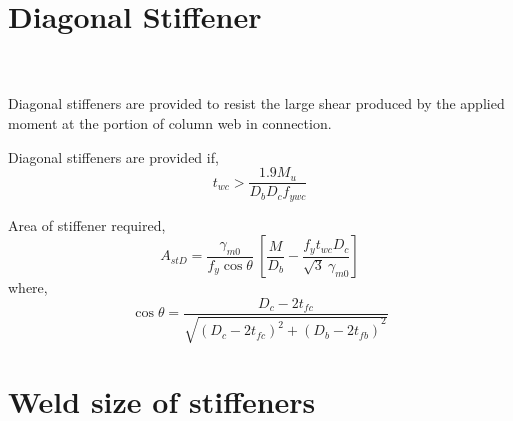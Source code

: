 \documentclass[11.5pt,a4paper,oneside]{report}
\begin{document}
\begin{Form}
\section{Diagonal Stiffener}
\qquad {} \\ \\

Diagonal stiffeners are provided to resist the large shear produced by the applied moment at the portion of column web in connection. 


Diagonal stiffeners are provided if,
\begin{equation}
	t_{wc} > \frac{1.9 M_u}{D_b D_c f_{ywc}}
\end{equation}

Area of stiffener required, 
\begin{equation}
	A_{stD} = 
		\frac{\gamma_{m0}}{f_y \cos{\theta}} ~ [
		\frac{M}{D_b} - 
		\frac{f_y t_{wc} D_c}{\sqrt{3} ~ \gamma_{m0}} ]
\end{equation}
where,
\begin{equation}
	\cos{\theta} = \frac{D_c - 2 t_{fc}}
	{\sqrt{{{(D_c - 2 t_{fc})}^2 + (D_b - 2 t_{fb})}^2}}
\end{equation}

\section{Weld size of stiffeners}
\end{Form}
\end{document}
